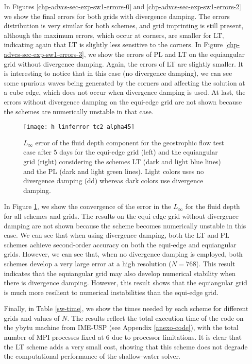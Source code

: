 In Figures \ref{chp-advcs-sec-exp-sw1-errors-0} and \ref{chp-advcs-sec-exp-sw1-errors-2} we show the final errors
for both grids with divergence damping.
The errors distribution is very similar for both schemes, and grid imprinting is still present, 
although the maximum errors, which occur at corners, are smaller for LT, indicating again that LT is slightly less sensitive to the corners.
In Figure \ref{chp-advcs-sec-exp-sw1-errors-3}, we show the errors of PL and LT on the equiangular grid without divergence damping.
Again, the errors of LT are slightly smaller. It is interesting to notice that in this case (no divergence damping), 
we can see some spurious waves being generated by the corners and affecting the solution at a cube edge, which does not occur when divergence damping is used.
At last, the errors without divergence damping on the equi-edge grid are not shown because the schemes are numerically unstable in that case.

\begin{figure}[!htb]
	\centering
	\texttt{[image: h\_linferror\_tc2\_alpha45]}
	\caption{$L_{\infty}$ error of the fluid depth component for the geostrophic flow test case after 5 days
		for the equi-edge grid (left) and the equiangular grid (right)
		considering the schemes LT (dark and light blue lines) and the PL (dark and light green lines). 
		Light colors uses no divergence damping (dd) whereas dark colors use divergence damping.\label{chp-advcs-sec-exp-sw-linf}}
\end{figure}

\newpage
In Figure \ref{chp-advcs-sec-exp-sw-linf}, we show the convergence of the error in the $L_{\infty}$ for the fluid depth for all schemes and grids.
The results on the equi-edge grid without divergence damping are not shown because the scheme becomes numerically unstable in this case.
We can see that when using divergence damping, both the LT and PL schemes achieve second-order accuracy on both the equi-edge and equiangular grids.
However, we can see that, when no divergence damping is employed, both schemes develop a very large error at a high resolution ($N=768$).
This result indicates that the equiangular grid may also develop numerical stability when there is divergence damping. 
However, this result shows that the equiangular grid is much more resilient to numerical instabilities than the equi-edge grid.

Finally, in Table \ref{sw-time}, we show the times needed by each scheme for different grids and values of $N$.
The results reflect the total execution time of the code on the ybytu machine from IME-USP (see Appendix \ref{anexo-code}), 
with the total number of MPI processes fixed at 6 due to processor limitations.
It is clear that the LT scheme adds a very small cost, showing that this scheme does not degrade the computational performance of the shallow-water solver.

